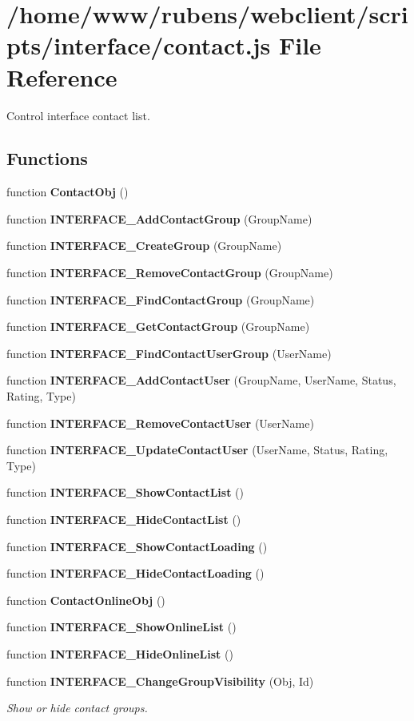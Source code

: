 \section{/home/www/rubens/webclient/scripts/interface/contact.js File Reference}
\label{interface_2contact_8js}
Control interface contact list. 

\subsection*{Functions}
\begin{CompactItemize}
\item 
function {\bf ContactObj} ()
\item 
function {\bf INTERFACE\_\-AddContactGroup} (GroupName)
\item 
function {\bf INTERFACE\_\-CreateGroup} (GroupName)
\item 
function {\bf INTERFACE\_\-RemoveContactGroup} (GroupName)
\item 
function {\bf INTERFACE\_\-FindContactGroup} (GroupName)
\item 
function {\bf INTERFACE\_\-GetContactGroup} (GroupName)
\item 
function {\bf INTERFACE\_\-FindContactUserGroup} (UserName)
\item 
function {\bf INTERFACE\_\-AddContactUser} (GroupName, UserName, Status, Rating, Type)
\item 
function {\bf INTERFACE\_\-RemoveContactUser} (UserName)
\item 
function {\bf INTERFACE\_\-UpdateContactUser} (UserName, Status, Rating, Type)
\item 
function {\bf INTERFACE\_\-ShowContactList} ()
\item 
function {\bf INTERFACE\_\-HideContactList} ()
\item 
function {\bf INTERFACE\_\-ShowContactLoading} ()
\item 
function {\bf INTERFACE\_\-HideContactLoading} ()
\item 
function {\bf ContactOnlineObj} ()
\item 
function {\bf INTERFACE\_\-ShowOnlineList} ()
\item 
function {\bf INTERFACE\_\-HideOnlineList} ()
\item 
function {\bf INTERFACE\_\-ChangeGroupVisibility} (Obj, Id)
\begin{CompactList}\small\item\em Show or hide contact groups. \item\end{CompactList}\item 

\end{CompactItemize}
